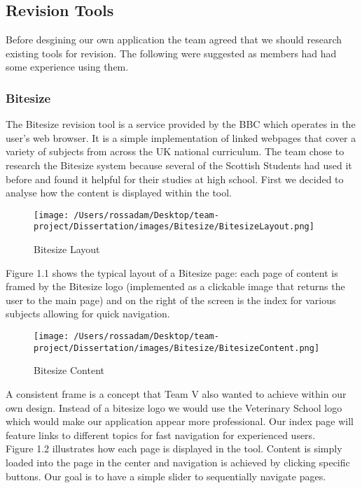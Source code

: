 \documentclass{l3proj}
\begin{document}
\subsection{Revision Tools}

Before desgining our own application the team agreed that we should
research existing tools for revision. The following were suggested as
members had had some experience using them. 

\subsubsection{Bitesize}
The Bitesize revision tool is a service provided by the BBC which
operates in the user's web browser. It is a simple implementation of
linked webpages that cover a variety of subjects from across the UK
national curriculum. The team chose to research the Bitesize system
because several of the Scottish Students had used it before and found
it helpful for their studies at high school. First we decided to analyse how the
content is displayed within the tool.\\

\begin{figure}[!htb]
\caption{Bitesize Layout}
 \centering
\texttt{[image: /Users/rossadam/Desktop/team-project/Dissertation/images/Bitesize/BitesizeLayout.png]}
\end{figure}

Figure 1.1 shows the typical layout of a Bitesize page: each page of
content is framed by the Bitesize logo (implemented as a clickable image that
returns the user to the main page) and on the right of the screen is
the index for various subjects allowing for quick navigation.\\

\begin{figure}[!ht]
\caption{Bitesize Content}
 \centering
\texttt{[image: /Users/rossadam/Desktop/team-project/Dissertation/images/Bitesize/BitesizeContent.png]}
\end{figure}

A consistent frame is a concept that Team V also wanted to achieve
within our own design. Instead of a bitesize logo we would use the
Veterinary School logo which would make our application appear more
professional. Our index page will feature links to different topics
for fast navigation for experienced users.\\


Figure 1.2 illustrates how each page is displayed in the tool. Content
is simply loaded into the page in the center and navigation is
achieved by clicking specific buttons. Our goal is to have a simple
slider to sequentially navigate pages.\\
\newpage
\end{document}
